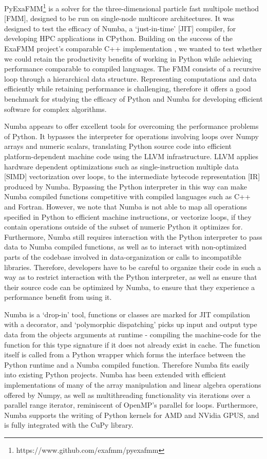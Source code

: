 \documentclass{IEEEcsmag}
\begin{document}
PyExaFMM\footnote{https://www.github.com/exafmm/pyexafmm} is a solver for the three-dimensional particle fast multipole method [FMM], designed to be run on single-node multicore architectures. It was designed to test the efficacy of Numba, a `just-in-time' [JIT] compiler, for developing HPC applications in CPython. Building on the success of the ExaFMM project's comparable C++ implementation \cite{Wang2021}, we wanted to test whether we could retain the productivity benefits of working in Python while achieving performance comparable to compiled languages.  The FMM consists of a recursive loop through a hierarchical data structure. Representing computations and data efficiently while retaining performance is challenging, therefore it offers a good benchmark for studying the efficacy of Python and Numba for developing efficient software for complex algorithms.

Numba appears to offer excellent tools for overcoming the performance problems of Python. It bypasses the interpreter for operations involving loops over Numpy arrays and numeric scalars, translating Python source code into efficient platform-dependent machine code using the LLVM infrastructure. LLVM applies hardware dependent optimizations such as single-instruction multiple data [SIMD] vectorization over loops, to the intermediate bytecode representation [IR] produced by Numba. Bypassing the Python interpreter in this way can make Numba compiled functions competitive with compiled languages such as C++ and Fortran. However, we note that Numba is not able to map all operations specified in Python to efficient machine instructions, or vectorize loops, if they contain operations outside of the subset of numeric Python it optimizes for. Furthermore, Numba still requires interaction with the Python interpreter to pass data to Numba compiled functions, as well as to interact with non-optimized parts of the codebase involved in data-organization or calls to incompatible libraries. Therefore, developers have to be careful to organize their code in such a way as to restrict interaction with the Python interpreter, as well as ensure that their source code can be optimized by Numba, to ensure that they experience a performance benefit from using it.

Numba is a `drop-in' tool, functions or classes are marked for JIT compilation with a decorator, and `polymorphic dispatching' picks up input and output type data from the objects arguments at runtime - compiling the machine-code for the function for this type signature if it does not already exist in cache. The function itself is called from a Python wrapper which forms the interface between the Python runtime and a Numba compiled function. Therefore Numba fits easily into existing Python projects. Numba has been extended with efficient implementations of many of the array manipulation and linear algebra operations offered by Numpy, as well as multithreading functionality via iterations over a parallel range iterator, reminiscent of OpenMP's parallel for loops. Furthermore, Numba supports the writing of Python kernels for AMD and NVidia GPUS, and is fully integrated with the CuPy library.
\end{document}
